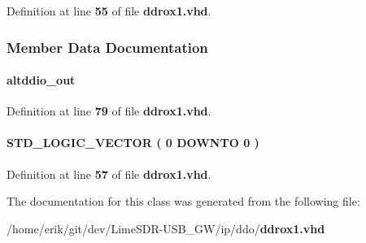 Definition at line {\bf 55} of file {\bf ddrox1.\+vhd}.



\subsubsection{Member Data Documentation}
\paragraph[{altddio\+\_\+out\+\_\+component}]{ {\bfseries \textcolor{vhdlchar}{altddio\+\_\+out}\textcolor{vhdlchar}{ }} \hspace{0.3cm}{\ttfamily [Instantiation]}}\label{classddrox1_1_1SYN_ac64e3d97688e4ce7e7b87896d83667f4}


Definition at line {\bf 79} of file {\bf ddrox1.\+vhd}.

\paragraph[{sub\+\_\+wire0}]{ {\bfseries \textcolor{comment}{S\+T\+D\+\_\+\+L\+O\+G\+I\+C\+\_\+\+V\+E\+C\+T\+OR}\textcolor{vhdlchar}{ }\textcolor{vhdlchar}{(}\textcolor{vhdlchar}{ }\textcolor{vhdlchar}{ } \textcolor{vhdldigit}{0} \textcolor{vhdlchar}{ }\textcolor{keywordflow}{D\+O\+W\+N\+TO}\textcolor{vhdlchar}{ }\textcolor{vhdlchar}{ } \textcolor{vhdldigit}{0} \textcolor{vhdlchar}{ }\textcolor{vhdlchar}{)}\textcolor{vhdlchar}{ }} \hspace{0.3cm}{\ttfamily [Signal]}}\label{classddrox1_1_1SYN_a55e2d3657751a4a346af609708ef225f}


Definition at line {\bf 57} of file {\bf ddrox1.\+vhd}.



The documentation for this class was generated from the following file\+:\begin{DoxyCompactItemize}
\item 
/home/erik/git/dev/\+Lime\+S\+D\+R-\/\+U\+S\+B\+\_\+\+G\+W/ip/ddo/{\bf ddrox1.\+vhd}\end{DoxyCompactItemize}
